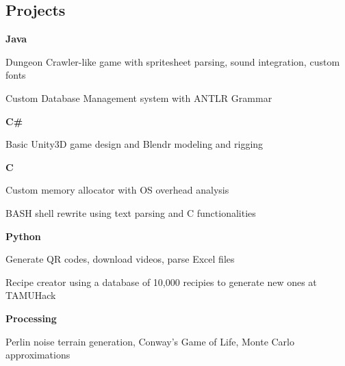 \documentclass[10pt,letterpaper]{article}
\newenvironment{indentsection}[1]%
{\begin{list}{}%
	{\setlength{\leftmargin}{#1}}%
	\item[]%
}
{\end{list}}
\newcommand{\CPP}
{C\nolinebreak[4]\hspace{-.05em}\raisebox{.22ex}{\footnotesize\bf ++}}
\begin{document}
\subsection*{Projects}
\begin{indentsection}{\parindent}
	\begin{itemize*}
	\item \textbf{Java} 
	\vspace{-0.4em}
		\begin{itemize*}
			\item Dungeon Crawler-like game with spritesheet parsing, sound integration, custom fonts 
			\item Custom Database Management system with ANTLR Grammar 
		\end{itemize*}
	\item \textbf{C\#} 
	\vspace{-0.4em}
		\begin{itemize*}
			\item Basic Unity3D game design and Blendr modeling and rigging 
		\end{itemize*}
	\item \textbf{\CPP}
	\vspace{-0.4em}
		\begin{itemize*}
			\item Custom memory allocator with OS overhead analysis
			\item BASH shell rewrite using text parsing and C functionalities 
		\end{itemize*}
	\item \textbf{Python}
	\vspace{-0.4em}
		\begin{itemize*}
			\item Generate QR codes, download videos, parse Excel files
			\item Recipe creator using a database of 10,000 recipies to generate new ones at 				TAMUHack 
		\end{itemize*}
	\item \textbf{Processing}
	\vspace{-0.4em}
		\begin{itemize*}
			\item Perlin noise terrain generation, Conway's Game of Life, Monte Carlo 								approximations
		\end{itemize*}
	\end{itemize*}
\end{indentsection}
\end{document}
